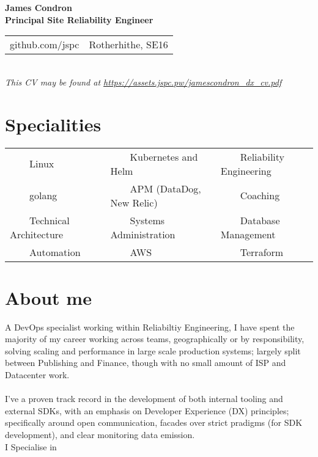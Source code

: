 \documentclass[11pt,a4paper,sans]{article}
\newcommand{\tabitem}{~~\llap{\textbullet}~~}
\begin{document}
\begin{center}
  {\huge\textbf{James Condron}}\\
  \textbf{Principal Site Reliability Engineer} \\

  \begin{tabular}{rl}
    github.com/jspc &  Rotherhithe, SE16
  \end{tabular} \\

  {\footnotesize\textit{This CV may be found at \url{https://assets.jspc.pw/jamescondron_dx_cv.pdf}}}
\end{center}

\section{Specialities}
\begin{tabular}{lll}
\tabitem Linux & \tabitem Kubernetes and Helm & \tabitem Reliability Engineering \\
\tabitem golang & \tabitem APM (DataDog, New Relic) & \tabitem Coaching \\
\tabitem Technical Architecture & \tabitem Systems Administration & \tabitem Database Management \\
\tabitem Automation & \tabitem AWS & \tabitem Terraform  \\
\end{tabular}

\section{About me}
A DevOps specialist working within Reliabiltiy Engineering, I have spent the majority of my career working across teams, geographically or by responsibility, solving scaling and performance in large scale production systems; largely split between Publishing and Finance, though with no small amount of ISP and Datacenter work. \\
\\
I've a proven track record in the development of both internal tooling and external SDKs, with an emphasis on Developer Experience (DX) principles; specifically around open communication, facades over strict pradigms (for SDK development), and clear monitoring data emission.
\\
I Specialise in
\end{document}
